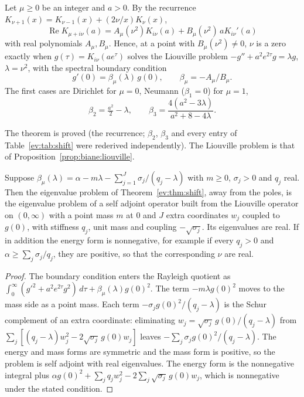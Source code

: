 \begin{theorem}\label{ev:thm:shift}
Let $\mu\ge0$ be an integer and $a>0$. By the recurrence $K_{\nu+1}(x)=K_{\nu-1}(x)+(2\nu/x)K_\nu(x)$,
\[
\operatorname{Re}K_{\mu+i\nu}(a)=A_\mu(\nu^2)K_{i\nu}(a)+B_\mu(\nu^2)\,aK_{i\nu}'(a)
\]
with real polynomials $A_\mu,B_\mu$. Hence, at a point with $B_\mu(\nu^2)\ne0$, $\nu$ is a zero exactly when $g(\tau)=K_{i\nu}(ae^\tau)$ solves the Liouville problem $-g''+a^2e^{2\tau}g=\lambda g$, $\lambda=\nu^2$, with the spectral boundary condition
\[
g'(0)=\beta_\mu(\lambda)\,g(0),\qquad\beta_\mu=-A_\mu/B_\mu.
\]
The first cases are Dirichlet for $\mu=0$, Neumann ($\beta_1=0$) for $\mu=1$,
\[
\beta_2=\tfrac{a^2}2-\lambda,\qquad\beta_3=\frac{4(a^2-3\lambda)}{a^2+8-4\lambda}.
\]
\end{theorem}

The theorem is proved (the recurrence; $\beta_2$, $\beta_3$ and every entry of Table~\ref{ev:tab:shift} were rederived independently). The Liouville problem is that of Proposition~\ref{prop:biane:liouville}.

\begin{proposition}\label{ev:prop:ext}
Suppose $\beta_\mu(\lambda)=\alpha-m\lambda-\sum_{j=1}^J\sigma_j/(q_j-\lambda)$ with $m\ge0$, $\sigma_j>0$ and $q_j$ real. Then the eigenvalue problem of Theorem~\ref{ev:thm:shift}, away from the poles, is the eigenvalue problem of a self adjoint operator built from the Liouville operator on $(0,\infty)$ with a point mass $m$ at $0$ and $J$ extra coordinates $w_j$ coupled to $g(0)$, with stiffness $q_j$, unit mass and coupling $-\sqrt{\sigma_j}$. Its eigenvalues are real. If in addition the energy form is nonnegative, for example if every $q_j>0$ and $\alpha\ge\sum_j\sigma_j/q_j$, they are positive, so that the corresponding $\nu$ are real.
\end{proposition}

\begin{proof}
The boundary condition enters the Rayleigh quotient as $\int_0^\infty(g'^2+a^2e^{2\tau}g^2)\,d\tau+\beta_\mu(\lambda)g(0)^2$. The term $-m\lambda g(0)^2$ moves to the mass side as a point mass. Each term $-\sigma_jg(0)^2/(q_j-\lambda)$ is the Schur complement of an extra coordinate: eliminating $w_j=\sqrt{\sigma_j}\,g(0)/(q_j-\lambda)$ from $\sum_j[(q_j-\lambda)w_j^2-2\sqrt{\sigma_j}\,g(0)w_j]$ leaves $-\sum_j\sigma_jg(0)^2/(q_j-\lambda)$. The energy and mass forms are symmetric and the mass form is positive, so the problem is self adjoint with real eigenvalues. The energy form is the nonnegative integral plus $\alpha g(0)^2+\sum_jq_jw_j^2-2\sum_j\sqrt{\sigma_j}\,g(0)w_j$, which is nonnegative under the stated condition.
\end{proof}

